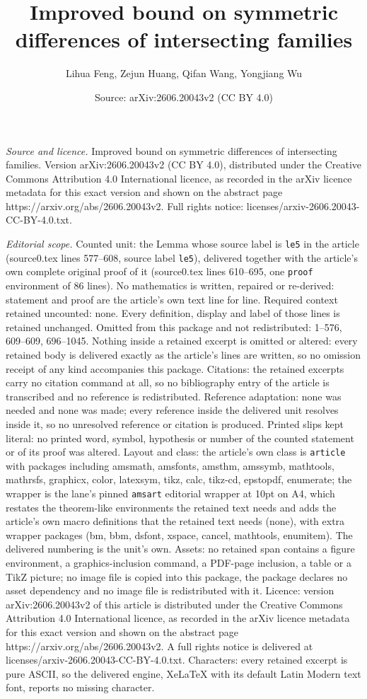 \documentclass[10pt,a4paper]{amsart}
\title[Improved bound on symmetric differences of intersecting fami]{Improved bound on symmetric differences of intersecting families}
\author{Lihua Feng, Zejun Huang, Qifan Wang, Yongjiang Wu}
\date{Source: arXiv:2606.20043v2 (CC BY 4.0)}
\begin{document}
\maketitle

\noindent\emph{Source and licence.} Improved bound on symmetric differences of intersecting families. Version arXiv:2606.20043v2 (CC BY 4.0), distributed under the Creative Commons Attribution 4.0 International licence, as recorded in the arXiv licence metadata for this exact version and shown on the abstract page https://arxiv.org/abs/2606.20043v2. Full rights notice: licenses/arxiv-2606.20043-CC-BY-4.0.txt.\par\smallskip

\noindent\textit{Editorial scope.} Counted unit: the Lemma whose source label is \texttt{le5} in the article (source0.tex lines 577--608, source label \texttt{le5}), delivered together with the article's own complete original proof of it (source0.tex lines 610--695, one \texttt{proof} environment of 86 lines). No mathematics is written, repaired or re-derived: statement and proof are the article's own text line for line. Required context retained uncounted: none. Every definition, display and label of those lines is retained unchanged. Omitted from this package and not redistributed: 1--576, 609--609, 696--1045. Nothing inside a retained excerpt is omitted or altered: every retained body is delivered exactly as the article's lines are written, so no omission receipt of any kind accompanies this package. Citations: the retained excerpts carry no citation command at all, so no bibliography entry of the article is transcribed and no reference is redistributed. Reference adaptation: none was needed and none was made; every reference inside the delivered unit resolves inside it, so no unresolved reference or citation is produced. Printed slips kept literal: no printed word, symbol, hypothesis or number of the counted statement or of its proof was altered. Layout and class: the article's own class is \texttt{article} with packages including amsmath, amsfonts, amsthm, amssymb, mathtools, mathrsfs, graphicx, color, latexsym, tikz, calc, tikz-cd, epstopdf, enumerate; the wrapper is the lane's pinned \texttt{amsart} editorial wrapper at 10pt on A4, which restates the theorem-like environments the retained text needs and adds the article's own macro definitions that the retained text needs (none), with extra wrapper packages (bm, bbm, dsfont, xspace, cancel, mathtools, enumitem). The delivered numbering is the unit's own. Assets: no retained span contains a figure environment, a graphics-inclusion command, a PDF-page inclusion, a table or a TikZ picture; no image file is copied into this package, the package declares no asset dependency and no image file is redistributed with it. Licence: version arXiv:2606.20043v2 of this article is distributed under the Creative Commons Attribution 4.0 International licence, as recorded in the arXiv licence metadata for this exact version and shown on the abstract page https://arxiv.org/abs/2606.20043v2. A full rights notice is delivered at licenses/arxiv-2606.20043-CC-BY-4.0.txt. Characters: every retained excerpt is pure ASCII, so the delivered engine, XeLaTeX with its default Latin Modern text font, reports no missing character.
\end{document}

